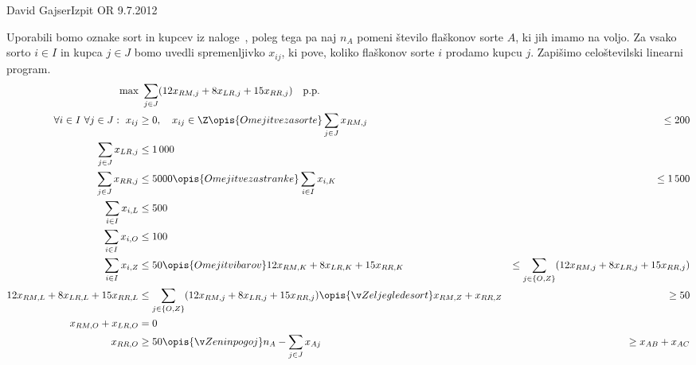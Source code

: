 \begin{naloga}{David Gajser}{Izpit OR 9.7.2012}
\begin{odgovor}
Uporabili bomo oznake sort in kupcev iz naloge~\res[vinar],
poleg tega pa naj $n_A$ pomeni število flaškonov sorte $A$,
ki jih imamo na voljo.
Za vsako sorto $i \in I$ in kupca $j \in J$
bomo uvedli spremenljivko $x_{ij}$,
ki pove, koliko flaškonov sorte $i$ prodamo kupcu $j$.
Zapišimo celoštevilski linearni program.
\begin{align*}
\max &\ \sum_{j \in J} (12 x_{RM,j} + 8 x_{LR,j} + 15 x_{RR,j})
\quad \text{p.p.} \\
\forall i \in I \ \forall j \in J: \ x_{ij} &\ge 0, \quad x_{ij} \in \Z
\opis{Omejitve za sorte}
\sum_{j \in J} x_{RM,j} &\le 200 \\
\sum_{j \in J} x_{LR,j} &\le 1\,000 \\
\sum_{j \in J} x_{RR,j} &\le 5000
\opis{Omejitve za stranke}
\sum_{i \in I} x_{i,K} &\le 1\,500 \\
\sum_{i \in I} x_{i,L} &\le 500 \\
\sum_{i \in I} x_{i,O} &\le 100 \\
\sum_{i \in I} x_{i,Z} &\le 50
\opis{Omejitvi barov}
12 x_{RM,K} + 8 x_{LR,K} + 15 x_{RR,K}
&\le \sum_{j \in \{O, Z\}} (12 x_{RM,j} + 8 x_{LR,j} + 15 x_{RR,j}) \\
12 x_{RM,L} + 8 x_{LR,L} + 15 x_{RR,L}
&\le \sum_{j \in \{O, Z\}} (12 x_{RM,j} + 8 x_{LR,j} + 15 x_{RR,j})
\opis{Želje glede sort}
x_{RM,Z} + x_{RR,Z} &\ge 50 \\
x_{RM,O} + x_{LR,O} &= 0 \\
x_{RR,O} &\ge 50
\opis{Ženin pogoj}
n_A - \sum_{j \in J} x_{Aj} &\ge x_{AB} + x_{AC}
\end{align*}
\end{odgovor}
\end{naloga}

